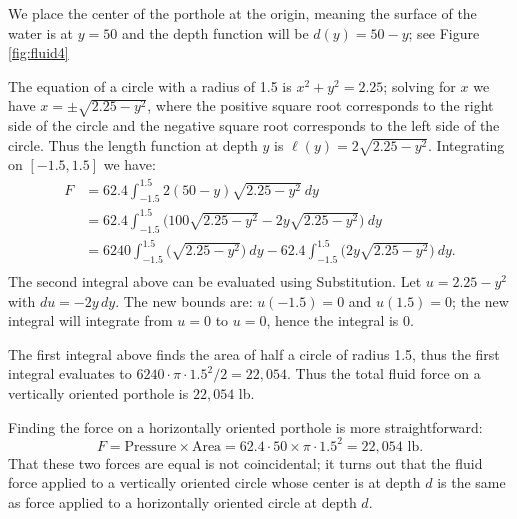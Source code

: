 {We place the center of the porthole at the origin, meaning the surface of the water is at $y=50$ and the depth function will be $d(y)=50-y$; see Figure \ref{fig:fluid4} 

The equation of a circle with a radius of 1.5 is $x^2+y^2=2.25$; solving for $x$ we have $x=\pm \sqrt{2.25-y^2}$, where the positive square root corresponds to the right side of the circle and the negative square root corresponds to the left side of the circle. Thus the length function at depth $y$ is $\ell(y) = 2\sqrt{2.25-y^2}$. Integrating on $[-1.5,1.5]$ we have:
\begin{align*}
F 		&= 62.4\int_{-1.5}^{1.5} 2(50-y)\sqrt{2.25-y^2}\ dy \\
			&= 62.4\int_{-1.5}^{1.5} \big(100\sqrt{2.25-y^2} - 2y\sqrt{2.25-y^2}\big)\ dy \\
			&= 6240\int_{-1.5}^{1.5} \big(\sqrt{2.25-y^2}\big)\ dy - 62.4\int_{-1.5}^{1.5} \big(2y\sqrt{2.25-y^2}\big)\ dy. \\
\end{align*}			
The second integral above can be evaluated using Substitution. Let $u=2.25-y^2$ with $du = -2y\,dy$. The new bounds are: $u(-1.5)=0$ and $u(1.5)=0$; the new integral will integrate from $u=0$ to $u=0$, hence the integral is 0.

The first integral above finds the area of half a circle of radius 1.5, thus the first integral evaluates to $6240\cdot\pi\cdot1.5^2/2 = 22,054$. Thus the total fluid force on a vertically oriented porthole is $22,054$ lb.

Finding the force on a horizontally oriented porthole is more straightforward:
$$F = \text{Pressure}\times\text{Area} = 62.4\cdot50\times \pi\cdot1.5^2 = 22,054\text{ lb}.$$
That these two forces are equal is not coincidental; it turns out that the fluid force applied to a vertically oriented circle whose center is at depth $d$ is the same as force applied to a horizontally oriented circle at depth $d$.
}\\


